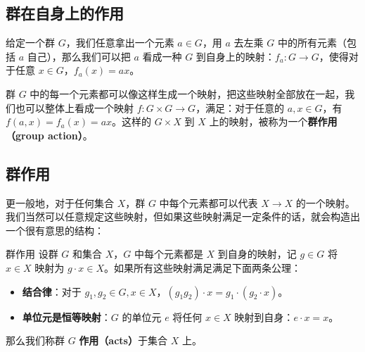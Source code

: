 


\subsection{群在自身上的作用}\label{sub_Group3_1}

给定一个群 $G$，我们任意拿出一个元素 $a\in G$，用 $a$ 去左乘 $G$ 中的所有元素（包括 $a$ 自己），那么我们可以把 $a$ 看成一种 $G$ 到自身上的映射：$f_a:G\rightarrow G$，使得对于任意 $x\in G$，$f_a(x)=ax$。

群 $G$ 中的每一个元素都可以像这样生成一个映射，把这些映射全部放在一起，我们也可以整体上看成一个映射 $f:G\times G\rightarrow G$，满足：对于任意的 $a, x\in G$，有 $f(a,x)=f_a(x)=ax$。这样的 $G\times X$ 到 $X$ 上的映射，被称为一个\textbf{群作用（group action）}。

% 

\subsection{群作用}

更一般地，对于任何集合 $X$，群 $G$ 中每个元素都可以代表 $X\rightarrow X$ 的一个映射。我们当然可以任意规定这些映射，但如果这些映射满足一定条件的话，就会构造出一个很有意思的结构：

\begin{definition}{群作用}\label{def_Group3_1}
设群 $G$ 和集合 $X$，$G$ 中每个元素都是 $X$ 到自身的映射，记 $g\in G$ 将 $x\in X$ 映射为 $g\cdot x\in X$。如果所有这些映射满足满足下面两条公理：
\begin{itemize}
\item \textbf{结合律}：对于 $g_1, g_2\in G, x\in X$，$(g_1 g_2)\cdot x=g_1\cdot (g_2\cdot x)$。
\item \textbf{单位元是恒等映射}：$G$ 的单位元 $e$ 将任何 $x\in X$ 映射到自身：$e\cdot x=x$。
\end{itemize}

那么我们称群 $G$ \textbf{作用（acts）}于集合 $X$ 上。

\end{definition}

